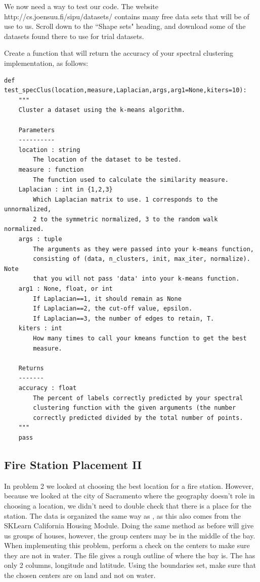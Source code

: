 We now need a way to test our code.  The website http://cs.joensuu.fi/sipu/datasets/ contains many free data sets that will be of use to us.  Scroll down to the ``Shape sets" heading, and download some of the datasets found there to use for trial datasets.
\begin{problem}
Create a function that will return the accuracy of your spectral clustering implementation, as follows:
\begin{lstlisting}
def test_specClus(location,measure,Laplacian,args,arg1=None,kiters=10):
    """
    Cluster a dataset using the k-means algorithm.

    Parameters
    ----------
    location : string
        The location of the dataset to be tested.
    measure : function
        The function used to calculate the similarity measure.
    Laplacian : int in {1,2,3}
        Which Laplacian matrix to use. 1 corresponds to the unnormalized,
        2 to the symmetric normalized, 3 to the random walk normalized.
    args : tuple
        The arguments as they were passed into your k-means function,
        consisting of (data, n_clusters, init, max_iter, normalize). Note
        that you will not pass 'data' into your k-means function.
    arg1 : None, float, or int
        If Laplacian==1, it should remain as None
        If Laplacian==2, the cut-off value, epsilon.
        If Laplacian==3, the number of edges to retain, T.
    kiters : int
        How many times to call your kmeans function to get the best
        measure.

    Returns
    -------
    accuracy : float
        The percent of labels correctly predicted by your spectral
        clustering function with the given arguments (the number
        correctly predicted divided by the total number of points.
    """
    pass
\end{lstlisting}
\end{problem}

\subsection*{Fire Station Placement II}
In problem 2 we looked at choosing the best location for a fire station. 
However, because we looked at the city of Sacramento where the geography doesn't role in choosing a location, we didn't need to double check that there is a place for the station.
The  data is organized the same way as , as this also comes from the SKLearn California Housing Module.
Doing the same method as before will give us groups of houses, however, the group centers may be in the middle of the bay.
When implementing this problem, perform a check on the centers to make sure they are not in water. 
The file  gives a rough outline of where the bay is.
The  has only 2 columns, longitude and latitude.
Using the boundaries set, make sure that the chosen centers are on land and not on water.

